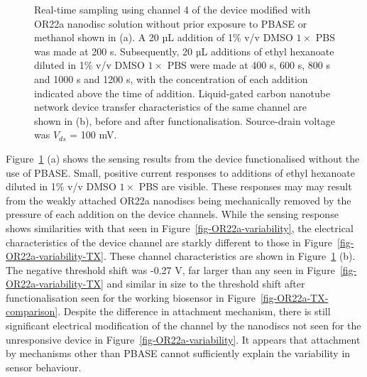 \documentclass[
  a4paper,
]{scrbook}
\begin{document}
\begin{figure}
\begin{minipage}[t]{0.01\linewidth}
{}

\end{minipage}%

\caption[Real-time sampling using a channel modified with OR22a nanodisc
solution without prior exposure to PBASE or methanol, alongside
liquid-gated transfer characteristics of the same
channel.]{\label{fig-OR22a-variability-noPBASE}Real-time sampling using
channel 4 of the device modified with OR22a nanodisc solution without
prior exposure to PBASE or methanol shown in (a). A 20 µL addition of
1\% v/v DMSO \(1 \times\) PBS was made at 200 s. Subsequently, 20 µL
additions of ethyl hexanoate diluted in 1\% v/v DMSO \(1 \times\) PBS
were made at 400 s, 600 s, 800 s and 1000 s and 1200 s, with the
concentration of each addition indicated above the time of addition.
Liquid-gated carbon nanotube network device transfer characteristics of
the same channel are shown in (b), before and after functionalisation.
Source-drain voltage was \(V_{ds}\) = 100 mV.}

\end{figure}

Figure~\ref{fig-OR22a-variability-noPBASE} (a) shows the sensing results
from the device functionalised without the use of PBASE. Small, positive
current responses to additions of ethyl hexanoate diluted in 1\% v/v
DMSO \(1 \times\) PBS are visible. These responses may may result from
the weakly attached OR22a nanodiscs being mechanically removed by the
pressure of each addition on the device channels. While the sensing
response shows similarities with that seen in
Figure~\ref{fig-OR22a-variability}, the electrical characteristics of
the device channel are starkly different to those in
Figure~\ref{fig-OR22a-variability-TX}. These channel characteristics are
shown in Figure~\ref{fig-OR22a-variability-noPBASE} (b). The negative
threshold shift was -0.27 V, far larger than any seen in
Figure~\ref{fig-OR22a-variability-TX} and similar in size to the
threshold shift after functionalisation seen for the working biosensor
in Figure~\ref{fig-OR22a-TX-comparison}. Despite the difference in
attachment mechanism, there is still significant electrical modification
of the channel by the nanodiscs not seen for the unresponsive device in
Figure~\ref{fig-OR22a-variability}. It appears that attachment by
mechanisms other than PBASE cannot sufficiently explain the variability
in sensor behaviour.
\end{document}
